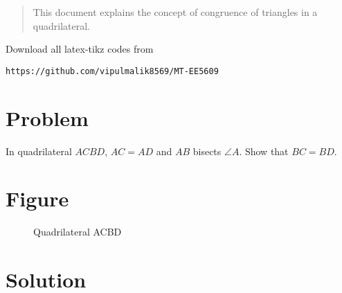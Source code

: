 \documentclass[journal,12pt,twocolumn]{IEEEtran}
\begin{document}
\date{\today}

\maketitle
\newpage
\bigskip
\renewcommand{\thefigure}{\theenumi}
\renewcommand{\thetable}{\theenumi}

\begin{abstract}
This document explains the concept of congruence of triangles in a quadrilateral.
\end{abstract}
Download all latex-tikz codes from 
\begin{lstlisting}
https://github.com/vipulmalik8569/MT-EE5609
\end{lstlisting}
\section{\textbf{Problem}}
In quadrilateral $ACBD$, $AC = AD$ and $AB$ bisects $\angle{A}$. Show that $BC = BD$. 

\section{Figure}
\begin{figure}[!htb]
	\centering
    \centering
    \resizebox{\columnwidth}{!}{}
	\caption{Quadrilateral ACBD}
\end{figure}

\section{\textbf{Solution}}
\end{document}
